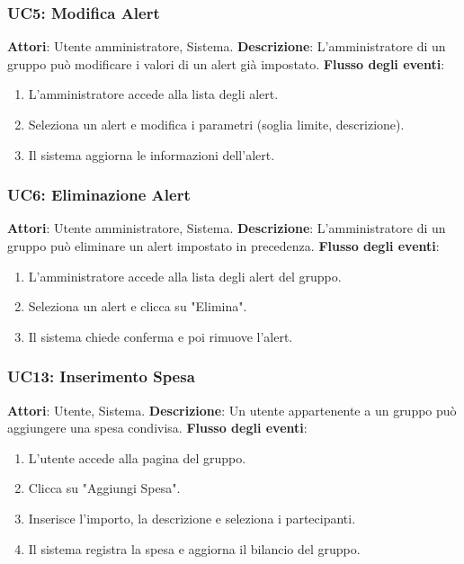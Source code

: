 \subsubsection{UC5: Modifica Alert}
\textbf{Attori}: Utente amministratore, Sistema.
\newline
\newline
\textbf{Descrizione}: L’amministratore di un gruppo può modificare i valori di un alert già impostato.
\newline
\newline
\textbf{Flusso degli eventi}:
\begin{enumerate}
    \item L’amministratore accede alla lista degli alert.
    \item Seleziona un alert e modifica i parametri (soglia limite, descrizione).
    \item Il sistema aggiorna le informazioni dell’alert.
\end{enumerate}

\subsubsection{UC6: Eliminazione Alert}
\textbf{Attori}: Utente amministratore, Sistema.
\newline
\newline
\textbf{Descrizione}: L’amministratore di un gruppo può eliminare un alert impostato in precedenza.
\newline
\newline
\textbf{Flusso degli eventi}:
\begin{enumerate}
    \item L’amministratore accede alla lista degli alert del gruppo.
    \item Seleziona un alert e clicca su "Elimina".
    \item Il sistema chiede conferma e poi rimuove l’alert.
\end{enumerate}

\subsubsection{UC13: Inserimento Spesa}
\textbf{Attori}: Utente, Sistema.
\newline
\newline
\textbf{Descrizione}: Un utente appartenente a un gruppo può aggiungere una spesa condivisa.
\newline
\newline
\textbf{Flusso degli eventi}:
\begin{enumerate}
    \item L’utente accede alla pagina del gruppo.
    \item Clicca su "Aggiungi Spesa".
    \item Inserisce l’importo, la descrizione e seleziona i partecipanti.
    \item Il sistema registra la spesa e aggiorna il bilancio del gruppo.
\end{enumerate}

